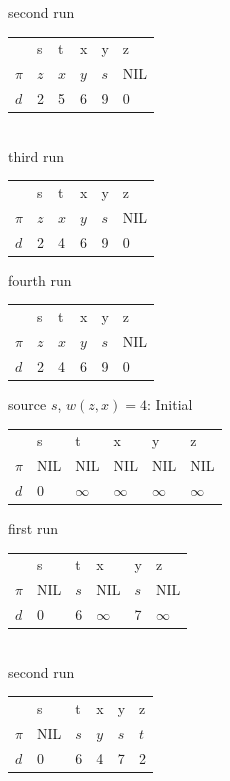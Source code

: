 \documentclass[]{memoir}
\begin{document}
\begin{enumerate}
second run
\begin{table}[h!]
\begin{tabular}{l|l|l|l|l|l}
      & s   & t   & x   & y   & z   \\
$\pi$ & $z$ & $x$ & $y$ & $s$ & NIL \\
$d$   & 2   & 5   & 6   & 9   & 0  
\end{tabular}
\end{table}
\pagebreak
\\
third run
\begin{table}[h!]
\begin{tabular}{l|l|l|l|l|l}
      & s   & t   & x   & y   & z   \\
$\pi$ & $z$ & $x$ & $y$ & $s$ & NIL \\
$d$   & 2   & 4   & 6   & 9   & 0  
\end{tabular}
\end{table}

fourth run
\begin{table}[h!]
\begin{tabular}{l|l|l|l|l|l}
      & s   & t   & x   & y   & z   \\
$\pi$ & $z$ & $x$ & $y$ & $s$ & NIL \\
$d$   & 2   & 4   & 6   & 9   & 0  
\end{tabular}
\end{table}

source $s$, $w(z,x)=4$:
Initial
\begin{table}[h]
\begin{tabular}{l|l|l|l|l|l}
      & s        & t        & x        & y        & z   \\
$\pi$ & NIL      & NIL      & NIL      & NIL      & NIL \\
$d$   & 0        & $\infty$ & $\infty$ & $\infty$ & $\infty$
\end{tabular}
\end{table}

first run
\begin{table}[h]
\begin{tabular}{l|l|l|l|l|l}
      & s        & t   & x        & y   & z   \\
$\pi$ & NIL      & $s$ & NIL      & $s$ & NIL \\
$d$   & 0        & 6   & $\infty$ & 7   & $\infty$
\end{tabular}
\end{table}
\pagebreak
\\
second run
\begin{table}[h]
\begin{tabular}{l|l|l|l|l|l}
      & s        & t   & x   & y   & z   \\
$\pi$ & NIL      & $s$ & $y$ & $s$ & $t$ \\
$d$   & 0        & 6   & 4   & 7   & 2
\end{tabular}
\end{table}


\end{enumerate}
\end{document}

